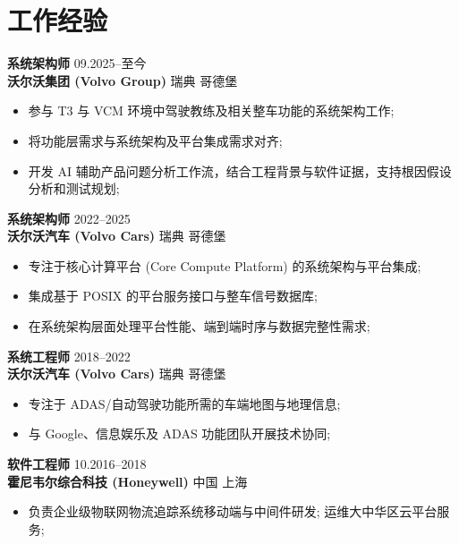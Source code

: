 \documentclass[11pt]{article}
\begin{document}

\section{工作经验}

\noindent\textbf{系统架构师} \hfill 09.2025--至今\\
\textbf{沃尔沃集团 (Volvo Group)} \hfill 瑞典 哥德堡
\begin{itemize}
    \item 参与 T3 与 VCM 环境中驾驶教练及相关整车功能的系统架构工作;
    \item 将功能层需求与系统架构及平台集成需求对齐;
    \item 开发 AI 辅助产品问题分析工作流，结合工程背景与软件证据，支持根因假设分析和测试规划;
\end{itemize}

\vspace{3pt}
\noindent\textbf{系统架构师} \hfill 2022--2025\\
\textbf{沃尔沃汽车 (Volvo Cars)} \hfill 瑞典 哥德堡
\begin{itemize}
    \item 专注于核心计算平台 (Core Compute Platform) 的系统架构与平台集成;
    \item 集成基于 POSIX 的平台服务接口与整车信号数据库;
    \item 在系统架构层面处理平台性能、端到端时序与数据完整性需求;
\end{itemize}

\vspace{3pt}
\noindent\textbf{系统工程师} \hfill 2018--2022\\
\textbf{沃尔沃汽车 (Volvo Cars)} \hfill 瑞典 哥德堡
\begin{itemize}
    \item 专注于 ADAS/自动驾驶功能所需的车端地图与地理信息;
    \item 与 Google、信息娱乐及 ADAS 功能团队开展技术协同;
\end{itemize}

\vspace{3pt}
\noindent\textbf{软件工程师} \hfill 10.2016--2018\\
\textbf{霍尼韦尔综合科技 (Honeywell)} \hfill 中国 上海
\begin{itemize}
    \item 负责企业级物联网物流追踪系统移动端与中间件研发; 运维大中华区云平台服务;
\end{itemize}
\end{document}
